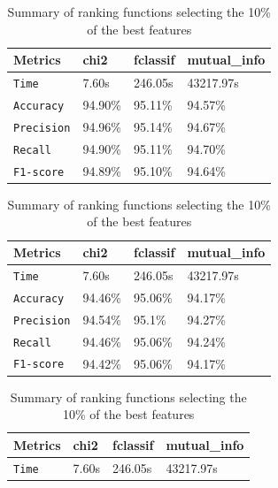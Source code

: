 \begin{table}[]

	\caption{Comparison of metrics score for different ranking functions with different percentages 	\label{tab:rank}}
	\begin{subtable}{\linewidth}
	\centering
	\caption{Summary of ranking functions selecting the 25\% of the best features}
	\label{tab:rank_function}
	\begin{tabular}{llll}
		\toprule
		\textbf{Metrics}  & \textbf{chi2} & \textbf{fclassif }& \textbf{mutual\_info} \\
		\midrule
		\texttt{Time} & 7.60s & 246.05s & 43217.97s\\
		
		\texttt{Accuracy} & 94.90\% &  95.11\% &  94.57\% \\
		\texttt{Precision}  & 94.96\% & 95.14\% &   94.67\%   \\ 
		\texttt{Recall} & 94.90\%  &   95.11\%  & 94.70\% \\ 
		\texttt{F1-score}  &   94.89\%   & 95.10\% &    94.64\%      \\ 
		\bottomrule
	\end{tabular}
	\end{subtable}

	\begin{subtable}{\linewidth}
	\centering
	\caption{Summary of ranking functions selecting the 15\% of the best features}
	\label{tab:rank_function15}
	\begin{tabular}{llll}
		\toprule
		\textbf{Metrics}  & \textbf{chi2} & \textbf{fclassif }& \textbf{mutual\_info} \\
		\midrule
		\texttt{Time} & 7.60s & 246.05s & 43217.97s\\
		
		\texttt{Accuracy} & 94.46\% &  95.06\% &  94.17\% \\
		\texttt{Precision}  & 94.54\% & 95.1\% &   94.27\%   \\ 
		\texttt{Recall} & 94.46\%  &   95.06\%  & 94.24\% \\ 
		\texttt{F1-score}  &   94.42\%   & 95.06\% &    94.17\%      \\ 
		\bottomrule
	\end{tabular}
	\end{subtable}
\begin{subtable}{\linewidth}
	\centering
	\caption{Summary of ranking functions selecting the 10\% of the best features}
	\label{tab:rank_function10}
	\begin{tabular}{llll}
		\toprule
		\textbf{Metrics}  & \textbf{chi2} & \textbf{fclassif }& \textbf{mutual\_info} \\
		\midrule
		\texttt{Time} & 7.60s & 246.05s & 43217.97s\\
		

\end{tabular}
\end{subtable}
\end{table}
